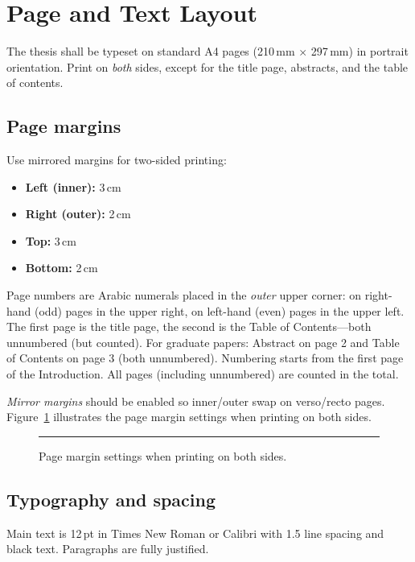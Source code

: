 \section{Page and Text Layout}

The thesis shall be typeset on standard A4 pages (210\,mm $\times$ 297\,mm) in portrait orientation. Print on \emph{both} sides, except for the title page, abstracts, and the table of contents.

\subsection*{Page margins}
Use mirrored margins for two-sided printing:
\begin{itemize}
  \item \textbf{Left (inner):} 3\,cm
  \item \textbf{Right (outer):} 2\,cm
  \item \textbf{Top:} 3\,cm
  \item \textbf{Bottom:} 2\,cm
\end{itemize}

Page numbers are Arabic numerals placed in the \emph{outer} upper corner: on right-hand (odd) pages in the upper right, on left-hand (even) pages in the upper left. The first page is the title page, the second is the Table of Contents—both unnumbered (but counted). For graduate papers: Abstract on page 2 and Table of Contents on page 3 (both unnumbered). Numbering starts from the first page of the Introduction. All pages (including unnumbered) are counted in the total.

\emph{Mirror margins} should be enabled so inner/outer swap on verso/recto pages. Figure~\ref{fig:pagemargins} illustrates the page margin settings when printing on both sides.

\begin{figure}[ht]
  \centering
  \rule{0.8\linewidth}{0.35\linewidth}
  \caption{Page margin settings when printing on both sides.}
  \label{fig:pagemargins}
\end{figure}

\subsection*{Typography and spacing}
Main text is 12\,pt in Times New Roman or Calibri with 1.5 line spacing and black text. Paragraphs are fully justified. 

